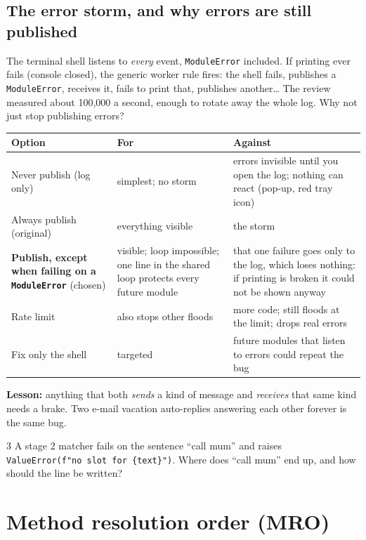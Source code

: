 \documentclass[11pt,a4paper]{article}
\begin{document}
\subsection{The error storm, and why errors are still published}\label{sec:storm}
The terminal shell listens to \emph{every} event, \texttt{ModuleError} included. If printing ever
fails (console closed), the generic worker rule fires: the shell fails, publishes a
\texttt{ModuleError}, receives it, fails to print that, publishes another\ldots{} The review measured
about 100{,}000 a second, enough to rotate away the whole log. Why not just stop publishing errors?
\begin{center}
\renewcommand{\arraystretch}{1.15}
\begin{tabularx}{\textwidth}{p{3.6cm} X X}
\toprule
\textbf{Option} & \textbf{For} & \textbf{Against} \\
\midrule
Never publish (log only) & simplest; no storm & errors invisible until you open the log; nothing can react (pop-up, red tray icon) \\
Always publish (original) & everything visible & the storm \\
\textbf{Publish, except when failing on a \texttt{ModuleError}} (chosen) & visible; loop impossible; one line in the shared loop protects every future module & that one failure goes only to the log, which loses nothing: if printing is broken it could not be shown anyway \\
Rate limit & also stops other floods & more code; still floods at the limit; drops real errors \\
Fix only the shell & targeted & future modules that listen to errors could repeat the bug \\
\bottomrule
\end{tabularx}
\end{center}
\noindent \textbf{Lesson:} anything that both \emph{sends} a kind of message and \emph{receives}
that same kind needs a brake. Two e-mail vacation auto-replies answering each other forever is the
same bug.

\begin{quickcheck}{3}
A stage 2 matcher fails on the sentence ``call mum'' and raises
\texttt{ValueError(f"no slot for \{text\}")}. Where does ``call mum'' end up, and how should the
line be written?
\end{quickcheck}

\section{Method resolution order (MRO)}\label{sec:mro}
\end{document}
